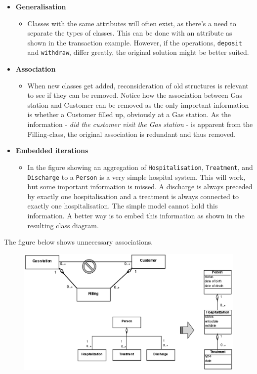 \begin{itemize}
    \item \textbf{Generalisation}
    \begin{itemize}
        \item Classes with the same attributes will often exist, as there's a need to separate the types of classes. This can be done with an attribute as shown in the transaction example. However, if the operations, \texttt{deposit} and \texttt{withdraw}, differ greatly, the original solution might be better suited.
    \end{itemize}
    \item \textbf{Association}
    \begin{itemize}
        \item When new classes get added, reconsideration of old structures is relevant to see if they can be removed. Notice how the association between Gas station and Customer can be removed as the only important information is whether a Customer filled up, obviously at a Gas station. As the information - \textit{did the customer visit the Gas station} - is apparent from the Filling-class, the original association is redundant and thus removed.
    \end{itemize}
    \item \textbf{Embedded iterations}
    \begin{itemize}
        \item In the figure showing an aggregation of \texttt{Hospitalisation}, \texttt{Treatment}, and \texttt{Discharge} to a \texttt{Person} is a very simple hospital system. This will work, but some important information is missed. A discharge is always preceded by exactly one hospitalisation and a treatment is always connected to exactly one hospitalisation. The simple model cannot hold this information. A better way is to embed this information as shown in the resulting class diagram.
    \end{itemize}
\end{itemize}

The figure below shows unnecessary associations.
\begin{figure}[H]
    \centering
    \includegraphics[width=\textwidth]{figures/modelcomponentrestructureclasses2.png}
\end{figure}


